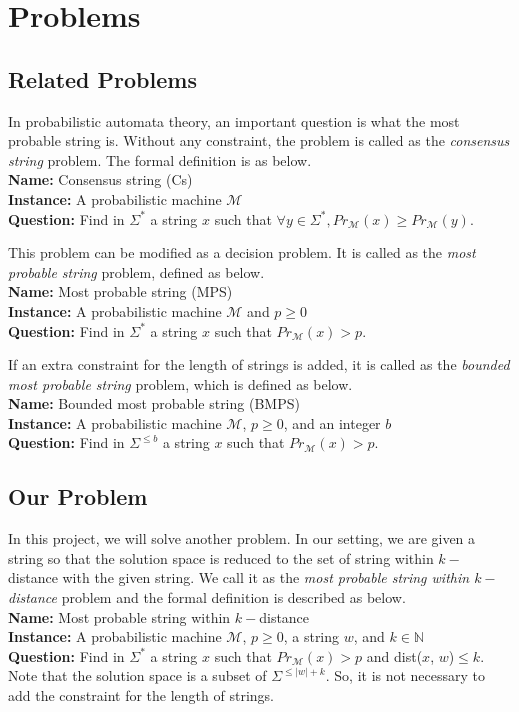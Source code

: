 \documentclass{article}
\theoremstyle{plain}
\theoremstyle{definition}
\theoremstyle{remark}
\begin{document}
\section{Problems}
\subsection{Related Problems}
In probabilistic automata theory, an important question is what the most probable string is. Without any constraint, the problem is called as the \textit{consensus string} problem. The formal definition is as below.\\
\textbf{Name:} Consensus string (Cs) \\
\textbf{Instance:} A probabilistic machine $\mathcal{M}$ \\
\textbf{Question:} Find in $\Sigma^{*}$ a string $x$ such that $\forall y\in \Sigma^{*}, {Pr}_{\mathcal{M}}(x) \geq {Pr}_{\mathcal{M}}(y)$.
\newline
\par
This problem can be modified as a decision problem. It is called as the \textit{most probable string} problem, defined as below. \\
\textbf{Name:} Most probable string (MPS) \\
\textbf{Instance:} A probabilistic machine $\mathcal{M}$ and $p\geq 0$ \\
\textbf{Question:} Find in $\Sigma^{*}$ a string $x$ such that ${Pr}_{\mathcal{M}}(x) > p$.
\newline
\par
If an extra constraint for the length of strings is added, it is called as the \textit{bounded most probable string} problem, which is defined as below. \\
\textbf{Name:} Bounded most probable string (BMPS)\\
\textbf{Instance:} A probabilistic machine $\mathcal{M}$, $p\geq 0$, and an integer $b$ \\
\textbf{Question:} Find in $\Sigma^{\leq b}$ a string $x$ such that ${Pr}_{\mathcal{M}}(x) > p$.
\par
\subsection{Our Problem}
In this project, we will solve another problem. In our setting, we are given a string so that the solution space is reduced to the set of string within $k-$distance with the given string. We call it as the \textit{most probable string within $k-$distance} problem and the formal definition is described as below. \\
\textbf{Name:} Most probable string within $k-$distance \\
\textbf{Instance:} A probabilistic machine $\mathcal{M}$, $p\geq 0$, a string $w$, and $k\in \mathbb{N}$ \\
\textbf{Question:} Find in $\Sigma^{*}$ a string $x$ such that ${Pr}_{\mathcal{M}}(x) > p$ and dist($x$, $w$)$\leq k$.\\
Note that the solution space is a subset of $\Sigma^{\leq |w|+k}$. So, it is not necessary to add the constraint for the length of strings.
\newline
\end{document}
